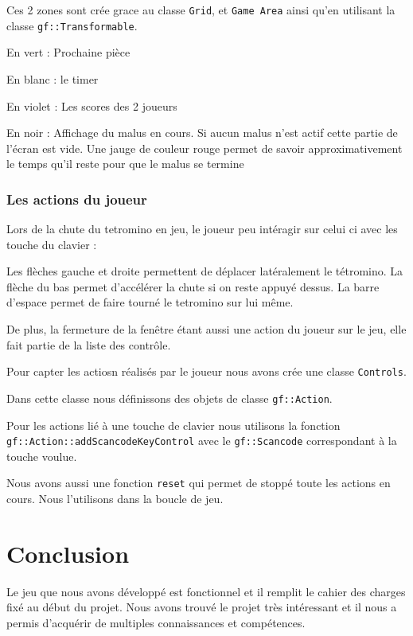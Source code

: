 \documentclass[a4paper, 12pt]{article}
\begin{document}
			Ces 2 zones sont crée grace au classe \texttt{Grid}, et \texttt{Game Area} ainsi qu’en utilisant la classe \texttt{gf::Transformable}.

			En vert : Prochaine pièce

			En blanc : le timer

			En violet : Les scores des 2 joueurs

			En noir : Affichage du malus en cours. Si aucun malus n’est actif cette partie de l’écran est vide. Une jauge de couleur rouge permet de savoir approximativement le temps qu’il reste pour que le malus se termine


		\subsubsection{Les actions du joueur}

			Lors de la chute du tetromino en jeu, le joueur peu intéragir sur celui ci avec les touche du clavier :

			Les flèches gauche et droite permettent de déplacer latéralement le tétromino.
			La flèche du bas permet d’accélérer la chute si on reste appuyé dessus.
			La barre d’espace permet de faire tourné le tetromino sur lui même.

			De plus, la fermeture de la fenêtre étant aussi une action du joueur sur le jeu, elle fait partie de la liste des contrôle.


			Pour capter les actiosn réalisés par le joueur nous avons crée une classe \texttt{Controls}.

			Dans cette classe nous définissons des objets de classe \texttt{gf::Action}.

			Pour les actions lié à une touche de clavier nous utilisons la fonction \texttt{gf::Action::addScancodeKeyControl} avec le \texttt{gf::Scancode} correspondant à la touche voulue.

			Nous avons aussi une fonction \texttt{reset} qui permet de stoppé toute les actions en cours. Nous l’utilisons dans la boucle de jeu.
	
	

\section*{Conclusion}

Le jeu que nous avons développé est fonctionnel et il remplit le cahier des charges fixé au début du projet. 
Nous avons trouvé le projet très intéressant et il nous a permis d’acquérir de multiples connaissances et compétences. 
\end{document}
